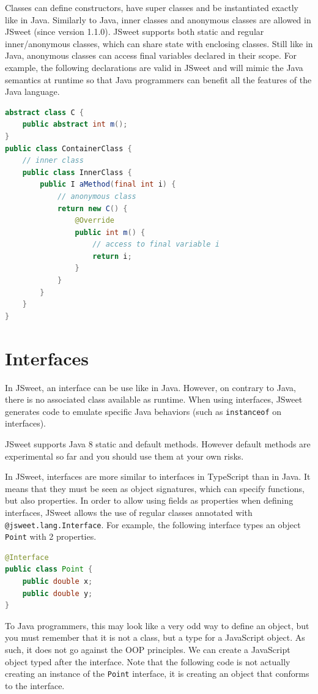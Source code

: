 \documentclass[a4paper]{report}
\begin{document}
Classes can define constructors, have super classes and be instantiated exactly like in Java. Similarly to Java, inner classes and anonymous classes are allowed in JSweet (since version 1.1.0). JSweet supports both static and regular inner/anonymous classes, which can share state with enclosing classes. Still like in Java, anonymous classes can access final variables declared in their scope. For example, the following declarations are valid in JSweet and will mimic the Java semantics at runtime so that Java programmers can benefit all the features of the Java language.

\begin{lstlisting}[language=Java]
abstract class C {
	public abstract int m();
}
public class ContainerClass {
	// inner class
	public class InnerClass {
		public I aMethod(final int i) {
			// anonymous class
			return new C() {
				@Override
				public int m() {
					// access to final variable i
					return i;
				}
			}
		}    
	}
}
\end{lstlisting}

\section{Interfaces}

In JSweet, an interface can be use like in Java. However, on contrary to Java, there is no associated class available as runtime. When using interfaces, JSweet generates code to emulate specific Java behaviors (such as \texttt{instanceof} on interfaces).

JSweet supports Java 8 static and default methods. However default methods are experimental so far and you should use them at your own risks.

In JSweet, interfaces are more similar to interfaces in TypeScript than in Java. It means that they must be seen as object signatures, which can specify functions, but also properties. In order to allow using fields as properties when defining interfaces, JSweet allows the use of regular classes annotated with \texttt{@jsweet.lang.Interface}. For example, the following interface types an object \texttt{Point} with 2 properties.

\begin{lstlisting}[language=Java]
@Interface
public class Point {
	public double x;
	public double y;	
}
\end{lstlisting}

To Java programmers, this may look like a very odd way to define an object, but you must remember that it is not a class, but a type for a JavaScript object. As such, it does not go against the OOP principles. We can create a JavaScript object typed after the interface. Note that the following code is not actually creating an instance of the \texttt{Point} interface, it is creating an object that conforms to the interface. 
\end{document}
